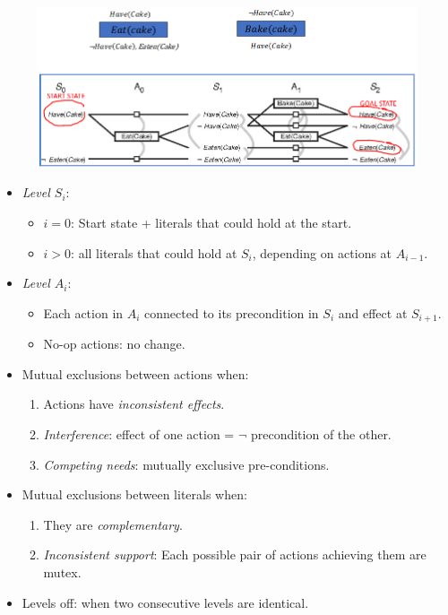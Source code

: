 \documentclass[twocolumn,english]{article}
\begin{document}
\begin{figure}[H]
\centering{}\includegraphics[width=0.9\columnwidth]{img/graph-plan}
\end{figure}
\begin{itemize}
\item \emph{Level $S_{i}$}:
\begin{itemize}
\item $i=0$: Start state + literals that could hold at the start.
\item $i>0$: all literals that could hold at $S_{i}$, depending on actions
at $A_{i-1}$.
\end{itemize}
\item \emph{Level $A_{i}$}:
\begin{itemize}
\item Each action in $A_{i}$ connected to its precondition in $S_{i}$
and effect at $S_{i+1}$.
\item No-op actions: no change.
\end{itemize}
\item Mutual exclusions between actions when:
\begin{enumerate}
\item Actions have \emph{inconsistent effects}.
\item \emph{Interference}: effect of one action = $\lnot$ precondition
of the other.
\item \emph{Competing needs}: mutually exclusive pre-conditions.
\end{enumerate}
\item Mutual exclusions between literals when:
\begin{enumerate}
\item They are \emph{complementary}.
\item \emph{Inconsistent support}: Each possible pair of actions achieving
them are mutex.
\end{enumerate}
\item Levels off: when two consecutive levels are identical.
\end{itemize}
\end{document}
